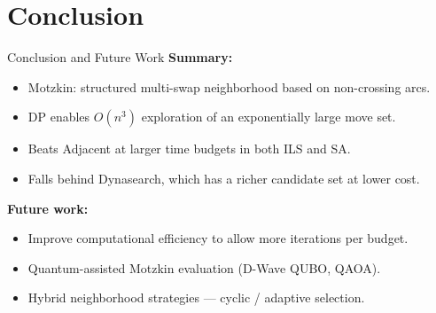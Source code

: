 \documentclass[aspectratio=169]{beamer}
\begin{document}
\section{Conclusion}
\begin{frame}{Conclusion and Future Work}
    \textbf{Summary:}
    \begin{itemize}
        \item Motzkin: structured multi-swap neighborhood based on non-crossing arcs.
        \item DP enables $O(n^3)$ exploration of an exponentially large move set.
        \item Beats Adjacent at larger time budgets in both ILS and SA.
        \item Falls behind Dynasearch, which has a richer candidate set at lower cost.
    \end{itemize}

    \vspace{0.2cm}
    \textbf{Future work:}
    \begin{itemize}
        \item Improve computational efficiency to allow more iterations per budget.
        \item Quantum-assisted Motzkin evaluation (D-Wave QUBO, QAOA).
        \item Hybrid neighborhood strategies --- cyclic / adaptive selection.
    \end{itemize}
\end{frame}
\end{document}
